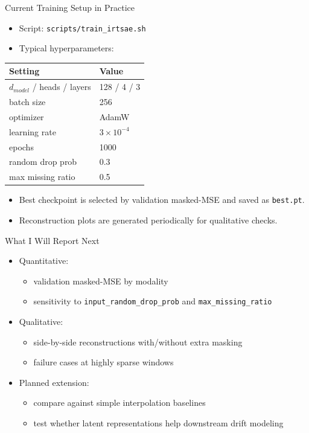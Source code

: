 \documentclass[aspectratio=169]{beamer}
\begin{document}
\begin{frame}{Current Training Setup in Practice}
  \begin{itemize}
    \item Script: \texttt{scripts/train\_irtsae.sh}
    \item Typical hyperparameters:
  \end{itemize}

  \begin{table}
    \centering
    \begin{tabular}{ll}
      \toprule
      Setting & Value \\
      \midrule
      \(d_{model}\) / heads / layers & 128 / 4 / 3 \\
      batch size & 256 \\
      optimizer & AdamW \\
      learning rate & \(3\times10^{-4}\) \\
      epochs & 1000 \\
      random drop prob & 0.3 \\
      max missing ratio & 0.5 \\
      \bottomrule
    \end{tabular}
  \end{table}

  \begin{itemize}
    \item Best checkpoint is selected by validation masked-MSE and saved as \texttt{best.pt}.
    \item Reconstruction plots are generated periodically for qualitative checks.
  \end{itemize}
\end{frame}

\begin{frame}{What I Will Report Next}
  \begin{itemize}
    \item Quantitative:
    \begin{itemize}
      \item validation masked-MSE by modality
      \item sensitivity to \texttt{input\_random\_drop\_prob} and \texttt{max\_missing\_ratio}
    \end{itemize}
    \item Qualitative:
    \begin{itemize}
      \item side-by-side reconstructions with/without extra masking
      \item failure cases at highly sparse windows
    \end{itemize}
    \item Planned extension:
    \begin{itemize}
      \item compare against simple interpolation baselines
      \item test whether latent representations help downstream drift modeling
    \end{itemize}
  \end{itemize}
\end{frame}
\end{document}
